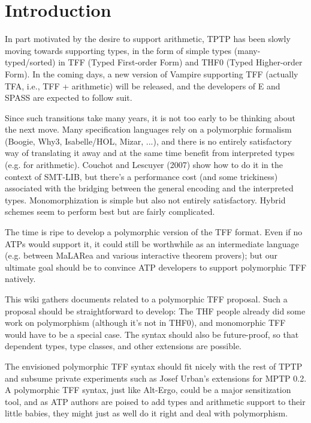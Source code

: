 \section{Introduction}
\label{sec_intro}

In part motivated by the desire to support arithmetic, TPTP has been slowly
moving towards supporting types, in the form of simple types (many-typed/sorted)
in TFF (Typed First-order Form) and THF0 (Typed Higher-order Form). In the
coming days, a new version of Vampire supporting TFF (actually TFA, i.e., TFF +
arithmetic) will be released, and the developers of E and SPASS are expected to
follow suit.

Since such transitions take many years, it is not too early to be thinking about
the next move. Many specification languages rely on a polymorphic formalism
(Boogie, Why3, Isabelle/HOL, Mizar, ...), and there is no entirely satisfactory
way of translating it away and at the same time benefit from interpreted types
(e.g. for arithmetic). Couchot and Lescuyer (2007) show how to do it in the
context of SMT-LIB, but there's a performance cost (and some trickiness)
associated with the bridging between the general encoding and the interpreted
types. Monomorphization is simple but also not entirely satisfactory. Hybrid
schemes seem to perform best but are fairly complicated.

The time is ripe to develop a polymorphic version of the TFF format. Even if no
ATPs would support it, it could still be worthwhile as an intermediate language
(e.g. between MaLARea and various interactive theorem provers); but our ultimate
goal should be to convince ATP developers to support polymorphic TFF natively.

This wiki gathers documents related to a polymorphic TFF proposal. Such a
proposal should be straightforward to develop: The THF people already did some
work on polymorphism (although it's not in THF0), and monomorphic TFF would have
to be a special case. The syntax should also be future-proof, so that dependent
types, type classes, and other extensions are possible.

The envisioned polymorphic TFF syntax should fit nicely with the rest of TPTP
and subsume private experiments such as Josef Urban's extensions for MPTP 0.2. A
polymorphic TFF syntax, just like Alt-Ergo, could be a major sensitization tool,
and as ATP authors are poised to add types and arithmetic support to their
little babies, they might just as well do it right and deal with polymorphism.
